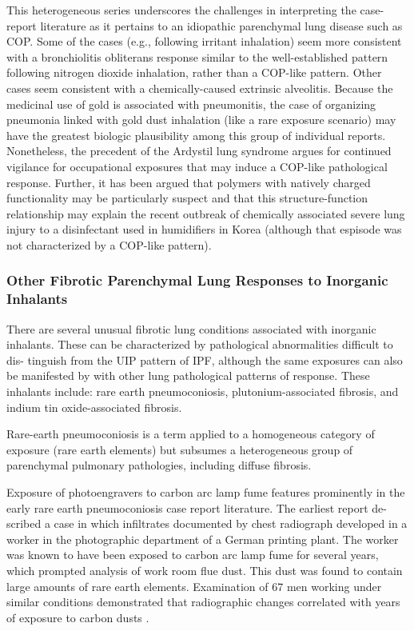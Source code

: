 \documentclass[a4
er,12pt]{article}
\begin{document}
This heterogeneous series underscores the challenges in interpreting the case- report literature as it pertains to an idiopathic parenchymal lung disease such as COP. Some of the cases (e.g., following irritant inhalation) seem more consistent with a bronchiolitis obliterans response similar to the well-established pattern following nitrogen dioxide inhalation, rather than a COP-like pattern. Other cases seem consistent with a chemically-caused extrinsic alveolitis. Because the medicinal use of gold is associated with pneumonitis\cite{Tomioka1997a}, the case of organizing pneumonia linked with gold dust inhalation (like a rare exposure scenario) may have the greatest biologic plausibility among this group of individual reports.  Nonetheless, the precedent of the Ardystil lung syndrome argues for continued vigilance for occupational exposures that may induce a COP-like pathological response. Further, it has been argued that polymers with natively charged functionality may be particularly suspect and that this structure-function relationship may explain the recent outbreak of chemically associated severe lung injury to a disinfectant used in humidifiers in Korea (although that espisode was not characterized by a COP-like pattern)\cite{Nemery2015}.

\subsubsection{Other Fibrotic Parenchymal Lung Responses to Inorganic Inhalants}
There are several unusual fibrotic lung conditions associated with inorganic inhalants. These can be characterized by pathological abnormalities difficult to dis- tinguish from the UIP pattern of IPF, although the same exposures can also be manifested by with other lung pathological patterns of response. These inhalants include: rare earth pneumoconiosis, plutonium-associated fibrosis, and indium tin oxide-associated fibrosis.

Rare-earth pneumoconiosis is a term applied to a homogeneous category of exposure (rare earth elements) but subsumes a heterogeneous group of parenchymal pulmonary pathologies, including diffuse fibrosis.

Exposure of photoengravers to carbon arc lamp fume features prominently in the early rare earth pneumoconiosis case report literature. The earliest report de- scribed a case in which infiltrates documented by chest radiograph developed in a worker in the photographic department of a German printing plant. The worker was known to have been exposed to carbon arc lamp fume for several years, which prompted analysis of work room flue dust. This dust was found to contain large amounts of rare earth elements. Examination of 67 men working under similar conditions demonstrated that radiographic changes correlated with years of exposure to carbon dusts \cite{Heuck1968}.
\end{document}
